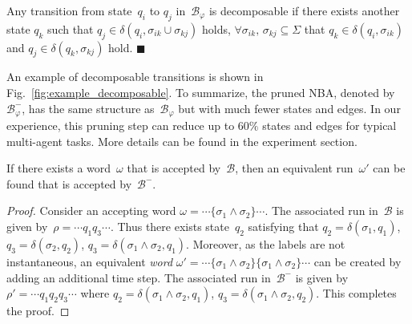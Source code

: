\begin{definition}\label{def:decomposable-transition}
Any transition from state~$q_i$ to $q_j$ in~$\mathcal{B}_{\varphi}$ is decomposable if there exists another state $q_k$ such that $q_j\in \delta(q_i,\sigma_{ik}\cup\sigma_{kj})$ holds,
$\forall \sigma_{ik},\,\sigma_{kj} \subseteq \Sigma$ that $q_k\in \delta(q_i,\sigma_{ik})$ and $q_j\in \delta(q_k,\sigma_{kj})$ hold.
\hfill $\blacksquare$
\end{definition}

An example of decomposable transitions is shown in Fig.~\ref{fig:example_decomposable}.
To summarize, the pruned NBA, denoted by~$\mathcal{B}^{-}_{\varphi}$,
has the same structure as~$\mathcal{B}_{\varphi}$ but with much fewer states and edges.
In our experience, this pruning step can reduce up to $60\%$ states and edges for typical multi-agent tasks.
More details can be found in the experiment section.
\begin{lemma}
  If there exists a word~$\omega$ that is accepted by~$\mathcal{B}$,
  then an equivalent run~$\omega'$ can be found that is accepted by~$\mathcal{B}^-$.
\end{lemma}
\begin{proof}
  Consider an accepting word $\omega=\cdots\{\sigma_1\land\sigma_2\}\cdots$.
  The associated run in~$\mathcal{B}$ is given by~$\rho=\cdots q_1 q_3\cdots$.
  Thus there exists state~$q_2$ satisfying that
  $q_2=\delta(\sigma_1,q_1)$, $q_3=\delta(\sigma_2,q_2)$, $q_3=\delta(\sigma_1\land\sigma_2,q_1)$.
  Moreover, as the labels are not instantaneous,
  an equivalent \emph{word} $\omega'=\cdots\{\sigma_1\land\sigma_2\}\{\sigma_1\land\sigma_2\}\cdots$
  can be created by adding an additional time step.
  The associated run in~$\mathcal{B}^-$ is given by~$\rho'=\cdots q_1 q_2 q_3\cdots$ where
  $q_2=\delta(\sigma_1\land\sigma_2,q_1)$, $q_3=\delta(\sigma_1\land\sigma_2,q_2)$.
  This completes the proof.
\end{proof}






